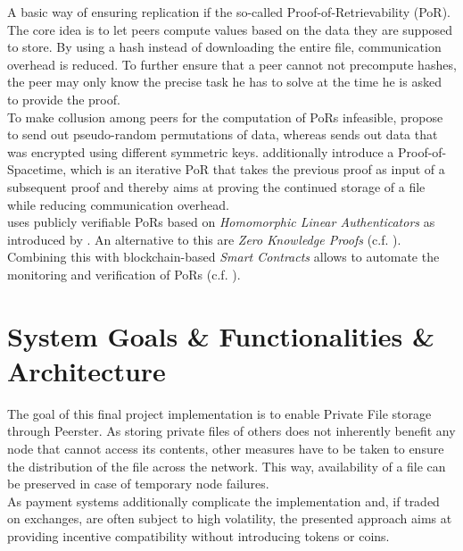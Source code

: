 \documentclass{article}
\begin{document}
A basic way of ensuring replication if the so-called Proof-of-Retrievability (PoR). The core idea is to let peers compute values based on the data they are supposed to store. By using a hash instead of downloading the entire file, communication overhead is reduced. To further ensure that a peer cannot not precompute hashes, the peer may only know the precise task he has to solve at the time he is asked to provide the proof.
\\
To make collusion among peers for the computation of PoRs infeasible, \cite{ProtocolLabs.2017} propose to send out pseudo-random permutations of data, whereas \cite{Vorick.2014} sends out data that was encrypted using different symmetric keys. 
\cite{ProtocolLabs.2017} additionally introduce a Proof-of-Spacetime, which is an iterative PoR that takes the previous proof as input of a subsequent proof and thereby aims at proving the continued storage of a file while reducing communication overhead.
\\
\cite{Kopp.2017} uses publicly verifiable PoRs based on \emph{Homomorphic Linear Authenticators} as introduced by \cite{Ateniese.2009}. An alternative to this are \emph{Zero Knowledge Proofs} (c.f. \cite{Lambert.2015}).
\\
Combining this with blockchain-based \emph{Smart Contracts} allows to automate the monitoring and verification of PoRs (c.f. \cite{Vorick.2014}). 


\section*{System Goals \& Functionalities \& Architecture} 
The goal of this final project implementation is to enable Private File storage through Peerster. As storing private files of others does not inherently benefit any node that cannot access its contents, other measures have to be taken to ensure the distribution of the file across the network. This way, availability of a file can be preserved in case of temporary node failures. \\
As payment systems additionally complicate the implementation and, if traded on exchanges, are often subject to high volatility, the presented approach aims at providing incentive compatibility without introducing tokens or coins. 
\\\vspace{0.5em}
\end{document}
